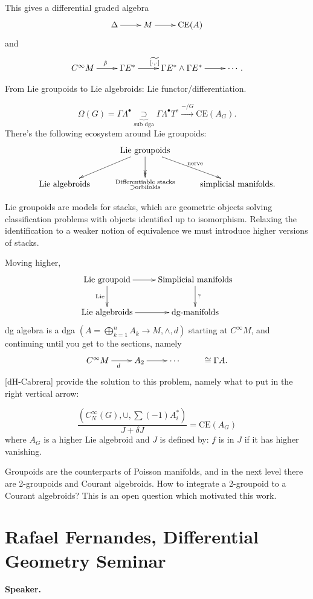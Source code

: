 \noindent
This gives a differential graded algebra
$$
\xymatrix{
\Delta\ar[r]&M\ar[r]&\text{CE}(A)
}
$$
and
$$
\xymatrix{
C^\infty M\ar[r]^{\tilde{\rho}}&\Gamma
E^*\ar[r]^{\widetilde{[\cdot,\cdot]}}
&\Gamma E^* \wedge \Gamma E^*\ar[r]&\cdots.
}
$$

From Lie groupoids to Lie algebroids:
Lie functor/differentiation.

$$
\Omega(G)=\Gamma \Lambda^\bullet
\underbrace{\supset}
_{\text{sub dga}}
\Gamma \Lambda^\bullet T^s
\xrightarrow{-/G}\text{CE}(A_G).
$$
There's the following ecosystem around Lie
groupoids:
$$
\xymatrix{
&\text{Lie groupoids}
\ar[dl]\ar@{->>}[d]\ar[dr]^{\text{nerve}}\\
\text{Lie algebroids}&
\substack{\text{Differentiable stacks} \\
\supset \text{orbifolds}}
&\text{simplicial manifolds.}
}
$$

\medskip\noindent
Lie groupoids are models for stacks,
which are geometric objects solving
classification
problems with objects identified up to
isomorphism.
Relaxing the identification to a weaker
notion
of equivalence we must introduce higher
versions of stacks.

Moving higher,
$$
\xymatrix{
\text{Lie groupoid}\ar[r]\ar[d]_{\text{Lie}}
&\text{Simplicial manifolds}\ar[d]^?\\
\text{Lie
algebroids}\ar[r]&\text{dg-manifolds}
}
$$
dg algebra is a  dga $(A=\bigoplus_{k=1}^n
A_k \to M,\wedge,d)$
starting at $C^\infty M$, and continuing
until you get to
the sections, namely
$$
\xymatrix{
C^\infty M \ar[r]_d & A_2 \ar[r]& \cdots &
\cong \Gamma A.
}
$$
[dH-Cabrera] provide the solution to this
problem,
namely what to put in the right vertical
arrow:

\begin{theorem}[dH-Cabrera]
\label{theorem-dh-cabrera}
$$
\frac{(C^\infty_N(G),\cup,\sum(-1)A^*_i)}{J+
\delta
J}
=\text{CE}(A_G)
$$
where $A_G$ is a higher Lie algebroid
and $J$ is defined by: $f$ is in $J$ if it
has higher vanishing.
\end{theorem}


Groupoids are the counterparts of Poisson
manifolds,
and in the next level there are 2-groupoids
and Courant algebroids.
How to integrate a 2-groupoid to a Courant
algebroids?
This is an open question which motivated this
work.

\section{Rafael Fernandes, Differential Geometry
Seminar}
\label{section-fernandes-today}
\medskip\noindent
{\bf Speaker.}

